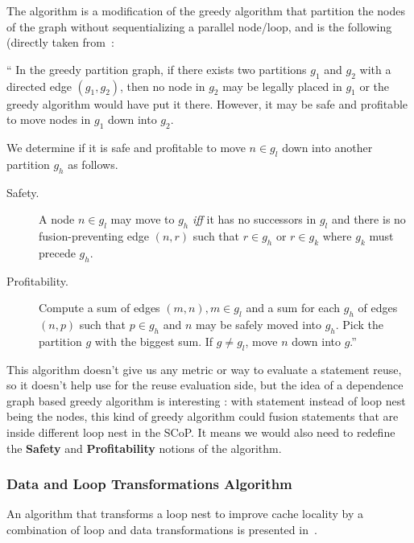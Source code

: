 \documentclass[paper=a4, fontsize=11pt]{scrartcl}
\numberwithin{equation}{section}        %
\numberwithin{figure}{section}          %
\numberwithin{table}{section}               %
\begin{document}
            The algorithm is a modification of the greedy algorithm that partition
            the nodes of the graph without sequentializing a parallel node/loop, and
            is the following (directly taken from~\cite{Kennedy94maximizingloop}:
            \medskip

            ``  In the greedy partition graph, if there exists two partitions $g_1$
                and $g_2$ with a directed edge $(g_1,g_2)$, then no node in $g_2$
                may be legally placed in $g_1$ or the greedy algorithm would have put it
                there. However, it may be safe and profitable to move nodes in $g_1$
                down into $g_2$.

                We determine if it is safe and profitable to move $n \in g_l$ down
                into another partition $g_h$ as follows.
                \begin{description}
                    \item [Safety.] A node $n \in g_l$ may move to $g_h$ \textit{iff} it
                        has no successors in $g_l$ and there is no fusion-preventing
                        edge $(n,r)$ such that $r \in g_h$ or $r \in g_k$ where
                        $g_k$ must precede $g_h$.
                    \item [Profitability.] Compute a sum of edges $(m,n), m \in g_l$
                        and a sum for each $g_h$ of edges $(n,p)$ such that $p \in g_h$
                        and $n$ may be safely moved into $g_h$. Pick the partition
                        $g$ with the biggest sum. If $g \neq g_l$, move $n$ down into $g$.''
                \end{description}
            \bigskip
            
            This algorithm doesn't give us any metric or way to evaluate a statement
            reuse, so it doesn't help use for the reuse evaluation side, but the idea
            of a dependence graph based greedy algorithm is interesting : with statement
            instead of loop nest being the nodes, this kind of greedy algorithm 
            could fusion statements that are inside different loop nest in the SCoP.
            It means we would also need to redefine the \textbf{Safety} and \textbf{Profitability}
            notions of the algorithm.

        \subsubsection{Data and Loop Transformations Algorithm}
            An algorithm that transforms a loop nest to improve cache locality
            by a combination of loop and data transformations is presented in~\cite{Kandemir99improvingcache}.
\end{document}
